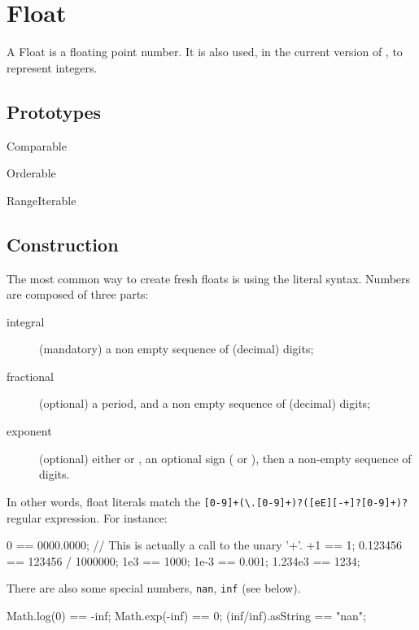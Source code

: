 \section{Float}

A Float is a floating point number.  It is also used, in the current
version of \us, to represent integers.

\subsection{Prototypes}

\begin{refObjects}
\item[Comparable]
\item[Orderable]
\item[RangeIterable]
\end{refObjects}

\subsection{Construction}
\label{sec:float:ctor}

The most common way to create fresh floats is using the literal
syntax.  Numbers are composed of three parts:
\begin{description}
\item[integral] (mandatory) a non empty sequence of (decimal) digits;
\item[fractional] (optional) a period, and a non empty sequence of
  (decimal) digits;
\item[exponent] (optional) either  or , an optional
  sign (\samp{+} or \samp{-}), then a non-empty sequence of digits.
\end{description}

In other words, float literals match the
\lstinline|[0-9]+(\.[0-9]+)?([eE][-+]?[0-9]+)?|
regular expression.  For instance:

\begin{urbiassert}
0 == 0000.0000;
// This is actually a call to the unary '+'.
+1 == 1;
0.123456 == 123456 / 1000000;
1e3 == 1000;
1e-3 == 0.001;
1.234e3 == 1234;
\end{urbiassert}

There are also some special numbers, \lstinline|nan|, \lstinline|inf|
(see below).

\begin{urbiassert}
Math.log(0) == -inf;
Math.exp(-inf) == 0;
(inf/inf).asString == "nan";
\end{urbiassert}

